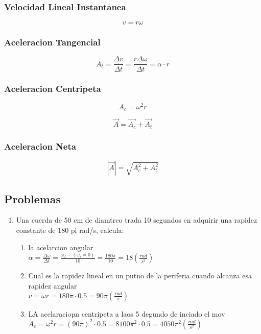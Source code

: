 \documentclass[11pt]{article}
\begin{document}
\subsubsection{Velocidad Lineal Instantanea}
\[v = r\omega \]

\subsubsection{Aceleracion Tangencial}
\[A_t = \frac{\Delta v}{\Delta t} = \frac{r\Delta\omega}{\Delta t} = \alpha \cdot r \]

\subsubsection{Aceleracion Centripeta}
\[A_c = \omega^2 r \]

\[\vec{A} = \vec{A_c} + \vec{A_t} \]

\subsubsection{Aceleracion Neta}
\[|\vec{A}| = \sqrt{A_c^2+ A_t^2} \]

\subsection{Problemas}
\begin{enumerate}
    \item Una cuerda de 50 cm de diamtreo trada 10 segundos en adquirir una rapidez constante de 180 pi rad/s, calcula:
        \begin{enumerate}
            \item la acelarcion angular\\
                $\alpha = \frac{\Delta\omega}{\Delta t} = \frac{\omega_f - (\omega_i =  0)}{10} = \frac{180\pi}{10} = 18 (\frac{rad}{s^2}) $\\

            \item Cual es la rapidez lineal en un putno de la periferia cuando alcanza esa rapidez angular\\
                $v = \omega r = 180\pi \cdot 0.5 = 90\pi (\frac{rad}{s}) $\\

            \item LA acelaraciopn centripeta a laos 5 degundo de inciado el mov\\
                $A_c = \omega^2 r = (90\pi)^2 \cdot 0.5 = 8100 \pi^2 \cdot 0.5 = 4050\pi^2 (\frac{rad}{s^2}) $
        \end{enumerate}
\end{enumerate}
\end{document}

